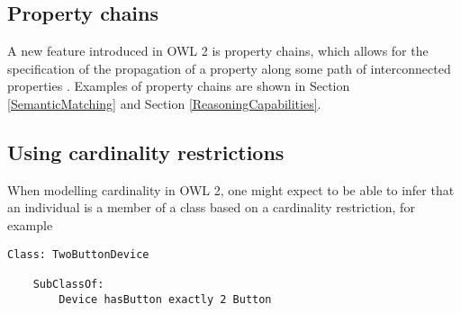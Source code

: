 \subsection{Property chains}

A new feature introduced in \ac{OWL} 2 is property chains, which allows for the specification of the propagation of a property along some path of interconnected properties \cite{Hoekstra2008}. Examples of property chains are shown in Section \ref{SemanticMatching} and Section \ref{ReasoningCapabilities}.


% 
% 
% 
% 
% 
% 
% 
% 
% 


\subsection{Using cardinality restrictions}
\label{CardinalityRestrictions}

When modelling cardinality in \ac{OWL} 2, one might expect to be able to infer that an individual is a member of a class based on a cardinality restriction, for example

\begin{verbatim}
Class: TwoButtonDevice 

	SubClassOf:
		Device hasButton exactly 2 Button
\end{verbatim}


